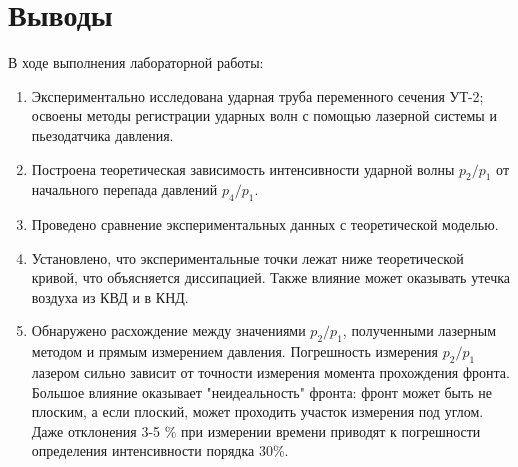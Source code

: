 \documentclass[12pt,a4paper]{article}
\begin{document}
\section{Выводы}
В ходе выполнения лабораторной работы:
\begin{enumerate}
    \item Экспериментально исследована ударная труба переменного сечения УТ-2; освоены методы регистрации ударных волн с помощью лазерной системы и пьезодатчика давления.
    \item Построена теоретическая зависимость интенсивности ударной волны $p_2/p_1$ от начального перепада давлений $p_4/p_1$.
    \item Проведено сравнение экспериментальных данных с теоретической моделью.
    \item Установлено, что экспериментальные точки лежат ниже теоретической кривой, что объясняется диссипацией. Также влияние может оказывать утечка воздуха из КВД и в КНД.
    \item Обнаружено расхождение между значениями $p_2/p_1$, полученными лазерным методом и прямым измерением давления. Погрешность измерения $p_2/p_1$ лазером сильно зависит от точности измерения момента прохождения фронта. Большое влияние оказывает "неидеальность" фронта: фронт может быть не плоским, а если плоский, может проходить участок измерения под углом. Даже отклонения 3-5 $\%$ при измерении времени приводят к погрешности определения интенсивности порядка 30\%.
\end{enumerate}
\end{document}
